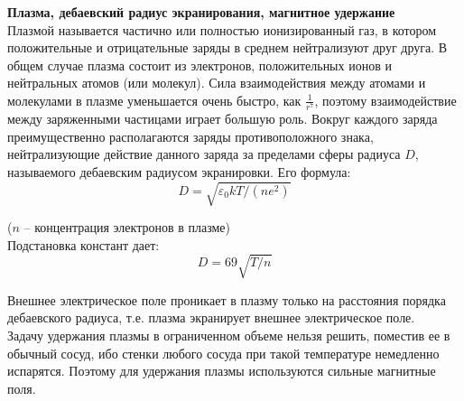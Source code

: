 \documentclass{article}
\begin{document}
	
	\textbf{Плазма, дебаевский радиус экранирования, магнитное удержание}\\

	Плазмой называется частично или полностью ионизированный газ, в котором положительные и отрицательные заряды в среднем нейтрализуют друг друга. В общем случае плазма состоит из электронов, положительных ионов и нейтральных атомов (или молекул). Сила взаимодействия между атомами и молекулами в плазме уменьшается очень быстро, как $\frac{1}{r^7}$, поэтому взаимодействие между заряженными частицами играет большую роль. Вокруг каждого заряда преимущественно располагаются заряды противоположного знака, нейтрализующие действие данного заряда за пределами сферы радиуса $D$, называемого дебаевским радиусом экранировки. Его формула:
	\begin{equation}
		D = \sqrt{\varepsilon_0 kT/(ne^2)}
	\end{equation}

	($n$ -- концентрация электронов в плазме)\\

	Подстановка констант дает:
	\begin{equation}
		D = 69\sqrt{T/n}
	\end{equation}

	Внешнее электрическое поле проникает в плазму только на расстояния порядка дебаевского радиуса, т.е. плазма экранирует внешнее электрическое поле.\\

	Задачу удержания плазмы в ограниченном объеме нельзя решить, поместив ее в обычный сосуд, ибо стенки любого сосуда при такой температуре немедленно испарятся. Поэтому для удержания плазмы используются сильные магнитные поля.\\
	
\end{document}
